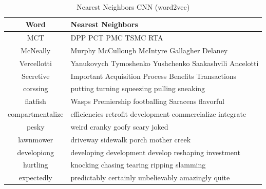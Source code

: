         \begin{table}[H]
          \begin{center}
            \caption{Nearest Neighbors CNN (word2vec)}
            ~\\
            \label{tab:nearest:cnn-word2vec}
            \begin{tabular}{c|l}
              \textbf{Word} & \textbf{Nearest Neighbors}\\
              \hline
              MCT & DPP PCT PMC TSMC RTA\\
              McNeally & Murphy McCullough McIntyre Gallagher Delaney\\
              Vercellotti & Yanukovych Tymoshenko Yushchenko Saakashvili Ancelotti\\
              Secretive & Important Acquisition Process Benefits Transactions\\
              corssing & putting turning squeezing pulling sneaking\\
              flatfish & Wasps Premiership footballing Saracens flavorful\\
              compartmentalize & efficiencies retrofit development commercialize integrate\\
              pesky & weird cranky goofy scary joked\\
              lawnmower & driveway sidewalk porch mother creek\\
              developiong & developing development develop reshaping investment\\
              hurtling & knocking chasing tearing ripping slamming\\
              expectedly & predictably certainly unbelievably amazingly quite\\
            \end{tabular}
          \end{center}
        \end{table}

        
        

